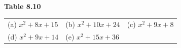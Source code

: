 \begin{enumerate}[noitemsep, label=\textbf{\arabic*}. ]
{{\begin{center}
\begin{tabular}[t]{|l|l|l|}
     \tabularnewline\cline{1-1}\cline{2-2}\cline{3-3}
    \end{tabular}
      \end{center}
    \begin{center}{\small\bfseries Table 8.10}\end{center}
          }{ %
        \begin{center}
      \label{m39394*id277586}
    \noindent
      \tablelasttail{}
      \begin{xtabular}[t]{|l|l|l|}\hline
        (a) ${x}^{2}+8x+15$\hspace{1ex} &
        (b) ${x}^{2}+10x+24$\hspace{1ex} &
        (c) ${x}^{2}+9x+8$\hspace{1ex}%
     \tabularnewline{}
        (d) ${x}^{2}+9x+14$\hspace{1ex} &
        (e) ${x}^{2}+15x+36$\hspace{1ex} &

\end{xtabular}
\end{center}}}
\end{enumerate}
